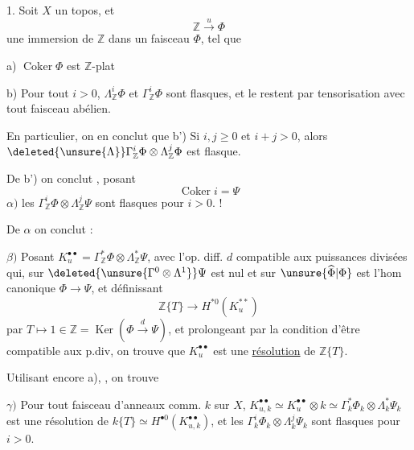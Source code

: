 1. Soit $X$ un topos, et
\[
\mathbb Z\xrightarrow{u}\Phi
\]
une immersion de $\mathbb Z$ dans un faisceau $\Phi$, tel que

a) $\operatorname{Coker}\Phi$ est $\mathbb Z$-plat

b) Pour tout $i>0$, $\Lambda_{\mathbb Z}^i\Phi$ et $\Gamma_{\mathbb Z}^i\Phi$ sont flasques, et le restent par tensorisation avec tout faisceau abélien.

En particulier, on en conclut  que 
b') Si $i,j\geq0$ et $i+j>0$, alors $\deleted{\unsure{\Lambda}}\Gamma_{\mathbb Z}^i\Phi\otimes\Lambda_{\mathbb Z}^j\Phi$ est flasque.

De b') on conclut , posant
\[
\operatorname{Coker}i=\Psi
\]
$\alpha)$ les $\Gamma_{\mathbb Z}^i\Phi\otimes\Lambda_{\mathbb Z}^j\Psi$ sont flasques pour $i>0$. !

De $\alpha$ on conclut :

$\beta)$ Posant $K_u^{\bullet\bullet}=\Gamma_{\mathbb Z}^*\Phi\otimes\Lambda_{\mathbb Z}^*\Psi$,
avec l'op. diff.  $d$ compatible aux puissances divisées qui,
sur $\deleted{\unsure{\Gamma^0\otimes\Lambda^1}}\Psi$ est nul et sur $\unsure{\widehat\Phi|\Phi}$ est l'hom canonique $\Phi\longrightarrow\Psi$, et définissant
\[
\mathbb Z\{T\}\longrightarrow H^{*0}(K_u^{**})
\]
par $T\longmapsto1\in\mathbb Z=\operatorname{Ker}(\Phi\xrightarrow{d}\Psi)$,
et prolongeant par la condition d'être compatible aux p.div,
on trouve que $K_u^{\bullet\bullet}$ est une \uline{résolution} de $\mathbb Z\{T\}$.

Utilisant encore a), , on trouve

$\gamma)$ Pour tout faisceau d'anneaux comm. $k$ sur $X$,
$K_{u,k}^{\bullet\bullet}\simeq K_u^{\bullet\bullet}\otimes k
\simeq\Gamma_k^*\Phi_k\otimes\Lambda_k^*\Psi_k$ est une résolution de
$k\{T\}\simeq H^{\bullet0}(K_{u,k}^{\bullet\bullet})$, et les
$\Gamma_k^i\Phi_k\otimes\Lambda_k^j\Psi_k$ sont flasques pour $i>0$.
